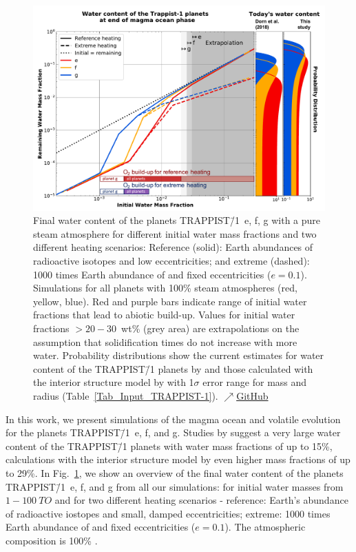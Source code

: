 \documentclass[paper=letterpaper,fontsize=12pt,oneside,twocolumn]{article}
\begin{document}
\begin{figure}[h]
    \centering
    \includegraphics[width=\textwidth]{BarthFig9.pdf}
    \caption{Final water content of the planets TRAPPIST\=/1~e, f, g with a pure steam atmosphere for different initial water mass fractions and two different heating scenarios: Reference (solid): Earth abundances of radioactive isotopes and low eccentricities; and extreme (dashed): 1000 times Earth abundance of  and fixed eccentricities ($e=0.1$). Simulations for all planets with 100\% steam atmospheres (red, yellow, blue). Red and purple bars indicate range of initial water fractions that lead to abiotic  build-up. Values for initial water fractions $>20-30$~wt\% (grey area) are extrapolations on the assumption that solidification times do not increase with more water. Probability distributions show the current estimates for water content of the TRAPPIST\=/1 planets by \citet{Dorn2018} and those calculated with the interior structure model by \citet[this study]{Noack2016} with 1$\sigma$ error range for mass and radius (Table~\ref{Tab_Input_TRAPPIST-1}).
    \href{https://github.com/pbfeu/Trappist1_MagmOc/tree/public/Fig_Trappist1_FinalWater}{$\nearrow$GitHub}
    }
    \label{TR1_Results_Oxy}%
\end{figure}

In this work, we present simulations of the magma ocean and volatile evolution for the planets TRAPPIST\=/1~e, f, and g. 
Studies by \citet{Dorn2018} suggest a very large water content of the TRAPPIST\=/1 planets with water mass fractions of up to 15\%, calculations with the interior structure model by \citet{Noack2016} even higher mass fractions of up to 29\%. 
In Fig.~\ref{TR1_Results_Oxy}, we show an overview of the final water content of the planets TRAPPIST\=/1~e, f, and g from all our simulations:
for initial water masses from $1-\SI{100}{TO}$ and for two different heating scenarios - reference: Earth's abundance of radioactive iostopes and small, damped eccentricities; extreme: 1000 times Earth abundance of  and fixed eccentricities ($e=0.1$).
The atmospheric composition is 100\% .
\end{document}
